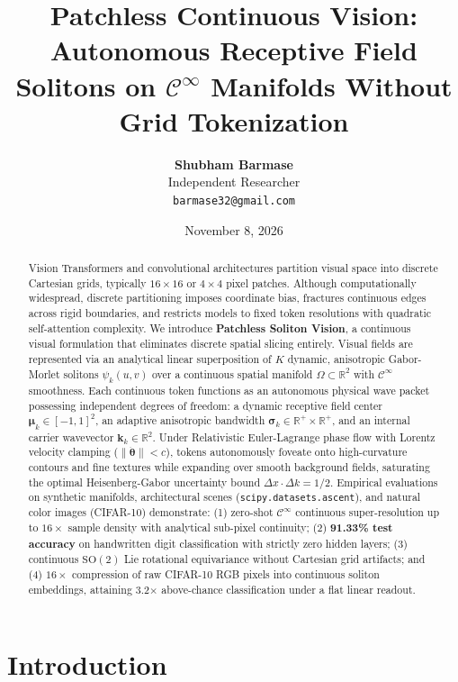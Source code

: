 \documentclass[10pt,twocolumn]{article}
\title{\LARGE\textbf{Patchless Continuous Vision: Autonomous Receptive Field Solitons on $\mathcal{C}^\infty$ Manifolds Without Grid Tokenization}}
\author{
  \textbf{Shubham Barmase} \\
  Independent Researcher \\
  \texttt{barmase32@gmail.com}
}
\date{November 8, 2026}
\begin{document}
\maketitle

\begin{abstract}
Vision Transformers and convolutional architectures partition visual space into discrete Cartesian grids, typically $16 \times 16$ or $4 \times 4$ pixel patches. Although computationally widespread, discrete partitioning imposes coordinate bias, fractures continuous edges across rigid boundaries, and restricts models to fixed token resolutions with quadratic self-attention complexity. We introduce \textbf{Patchless Soliton Vision}, a continuous visual formulation that eliminates discrete spatial slicing entirely. Visual fields are represented via an analytical linear superposition of $K$ dynamic, anisotropic Gabor-Morlet solitons $\psi_k(u, v)$ over a continuous spatial manifold $\Omega \subset \mathbb{R}^2$ with $\mathcal{C}^\infty$ smoothness. Each continuous token functions as an autonomous physical wave packet possessing independent degrees of freedom: a dynamic receptive field center $\mathbf{\mu}_k \in [-1, 1]^2$, an adaptive anisotropic bandwidth $\mathbf{\sigma}_k \in \mathbb{R}^+ \times \mathbb{R}^+$, and an internal carrier wavevector $\mathbf{k}_k \in \mathbb{R}^2$. Under Relativistic Euler-Lagrange phase flow with Lorentz velocity clamping ($\|\dot{\mathbf{\theta}}\| < c$), tokens autonomously foveate onto high-curvature contours and fine textures while expanding over smooth background fields, saturating the optimal Heisenberg-Gabor uncertainty bound $\Delta x \cdot \Delta k = 1/2$. Empirical evaluations on synthetic manifolds, architectural scenes (\texttt{scipy.datasets.ascent}), and natural color images (CIFAR-10) demonstrate: (1) zero-shot $\mathcal{C}^\infty$ continuous super-resolution up to $16\times$ sample density with analytical sub-pixel continuity; (2) \textbf{91.33\% test accuracy} on handwritten digit classification with strictly zero hidden layers; (3) continuous $\mathrm{SO}(2)$ Lie rotational equivariance without Cartesian grid artifacts; and (4) $16\times$ compression of raw CIFAR-10 RGB pixels into continuous soliton embeddings, attaining 3.2$\times$ above-chance classification under a flat linear readout.
\end{abstract}

\section{Introduction}
\end{document}
